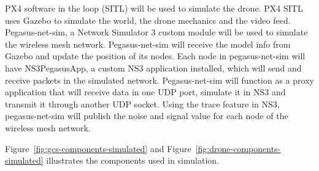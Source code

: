 PX4 software in the loop (SITL) will be used to simulate the drone. PX4 SITL uses Gazebo to simulate the world, the drone mechanics and the video feed. Pegasus-net-sim, a Network Simulator 3 custom module will be used to simulate the wireless mesh network. Pegasus-net-sim will receive the model info from Gazebo and update the position of its nodes. Each node in pegasus-net-sim will have NS3PegasusApp, a custom NS3 application installed, which will send and receive packets in the simulated network. Pegasus-net-sim will function as a proxy application that will receive data in one UDP port, simulate it in NS3 and transmit it through another UDP socket. Using the trace feature in NS3, pegasus-net-sim will publish the noise and signal value for each node of the wireless mesh network.

Figure~\ref{fig:gcs-components-simulated} and Figure~\ref{fig:drone-components-simulated} illustrates the components used in simulation. 

